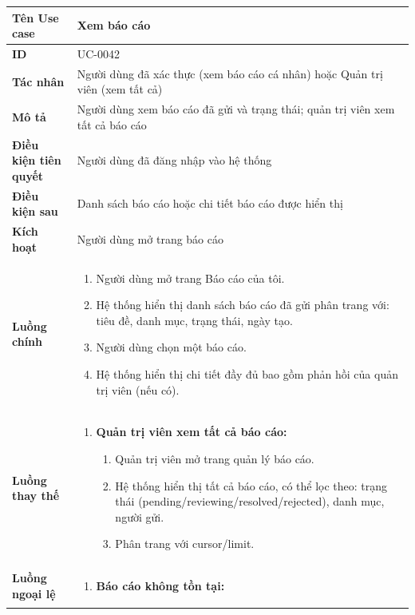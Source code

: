 {
\renewcommand{\arraystretch}{1.5}

\begin{tabularx}{\textwidth}{|>{\raggedright\arraybackslash}X|>{\raggedright\arraybackslash}X|}
\hline
\textbf{Tên Use case} & Xem báo cáo \\
\hline
\textbf{ID} & UC-0042 \\
\hline
\textbf{Tác nhân} & Người dùng đã xác thực (xem báo cáo cá nhân) hoặc Quản trị viên (xem tất cả) \\
\hline
\textbf{Mô tả} & Người dùng xem báo cáo đã gửi và trạng thái; quản trị viên xem tất cả báo cáo \\
\hline
\textbf{Điều kiện tiên quyết} & Người dùng đã đăng nhập vào hệ thống \\
\hline
\textbf{Điều kiện sau} & Danh sách báo cáo hoặc chi tiết báo cáo được hiển thị \\
\hline
\textbf{Kích hoạt} & Người dùng mở trang báo cáo \\
\hline
\textbf{Luồng chính} &
\begin{enumerate}
    \item Người dùng mở trang Báo cáo của tôi.
    \item Hệ thống hiển thị danh sách báo cáo đã gửi phân trang với: tiêu đề, danh mục, trạng thái, ngày tạo.
    \item Người dùng chọn một báo cáo.
    \item Hệ thống hiển thị chi tiết đầy đủ bao gồm phản hồi của quản trị viên (nếu có).
\end{enumerate} \\
\hline
\textbf{Luồng thay thế} &
\begin{enumerate}
    \item \textbf{Quản trị viên xem tất cả báo cáo:}
    \begin{enumerate}
        \item[1A.] Quản trị viên mở trang quản lý báo cáo.
        \item[2A.] Hệ thống hiển thị tất cả báo cáo, có thể lọc theo: trạng thái (pending/reviewing/resolved/rejected), danh mục, người gửi.
        \item[3A.] Phân trang với cursor/limit.
    \end{enumerate}
\end{enumerate} \\
\hline
\textbf{Luồng ngoại lệ} &
\begin{enumerate}
    \item \textbf{Báo cáo không tồn tại:}

\end{enumerate}
\end{tabularx}}
